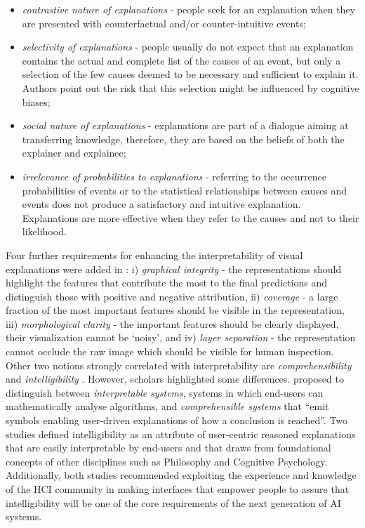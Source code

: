\documentclass[final,1p,times]{elsarticle}
\begin{document}
\begin{itemize}
    \item \textit{contrastive nature of explanations} - people seek for an explanation when they are presented with counterfactual and/or counter-intuitive events;
    \item \textit{selectivity of explanations} - people usually do not expect that an explanation contains the actual and complete list of the causes of an event, but only a selection of the few causes deemed to be necessary and sufficient to explain it. Authors point out the risk that this selection might be influenced by cognitive biases;
    \item \textit{social nature of explanations} - explanations are part of a dialogue aiming at transferring knowledge, therefore, they are based on the beliefs of both the explainer and explainee;
    \item \textit{irrelevance of probabilities to explanations} - referring to the occurrence probabilities of events or to the statistical relationships between causes and events does not produce a satisfactory and intuitive explanation. Explanations are more effective when they refer to the causes and not to their likelihood. 
\end{itemize}
Four further requirements for enhancing the interpretability of visual explanations were added in \cite{sundararajan2019exploring}: i) \textit{graphical integrity} - the representations should highlight the features that contribute the most to the final predictions and distinguish those with positive and negative attribution, ii) \textit{coverage} - a large fraction of the most important features should be visible in the representation, iii) \textit{morphological clarity} - the important features should be clearly displayed, their visualization cannot be `noisy', and iv) \textit{layer separation} - the representation cannot occlude the raw image which should be visible for human inspection.
Other two notions strongly correlated with interpretability are \textit{comprehensibility} \cite{bibal2016interpretability} and \textit{intelligibility} \cite{abdul2018trends}. However, scholars highlighted some differences. \cite{doran2017does} proposed to distinguish between \textit{interpretable systems}, systems in which end-users can mathematically analyse algorithms, and \textit{comprehensible systems} that ``emit symbols enabling user-driven explanations of how a conclusion is reached''. Two studies \cite{abdul2018trends,lim2019these} defined intelligibility as an attribute of user-centric reasoned explanations that are easily interpretable by end-users and that draws from foundational concepts of other disciplines such as Philosophy and Cognitive Psychology. Additionally, both studies recommended exploiting the experience and knowledge of the HCI community in making interfaces that empower people to assure that intelligibility will be one of the core requirements of the next generation of AI systems.
\end{document}

